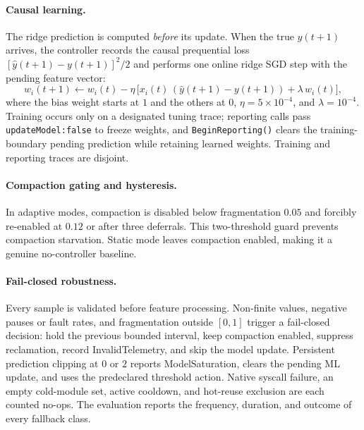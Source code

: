 \documentclass[acmsmall,screen]{acmart}
\begin{document}
\paragraph{Causal learning.}
The ridge prediction is computed \emph{before} its update. When the true
$y(t{+}1)$ arrives, the controller records the causal prequential loss
$[\hat{y}(t{+}1)-y(t{+}1)]^2/2$ and performs one online ridge SGD step with
the pending feature vector:
\begin{equation}
w_i(t{+}1) \leftarrow w_i(t) -
  \eta\,\bigl[x_i(t)\,(\hat{y}(t{+}1)-y(t{+}1)) + \lambda\, w_i(t)\bigr],
\end{equation}
where the bias weight starts at $1$ and the others at $0$,
$\eta = 5\times10^{-4}$, and $\lambda = 10^{-4}$. Training occurs only on a
designated tuning trace; reporting calls pass \texttt{updateModel:false} to
freeze weights, and \texttt{BeginReporting()} clears the training-boundary
pending prediction while retaining learned weights. Training and reporting
traces are disjoint.

\paragraph{Compaction gating and hysteresis.}
In adaptive modes, compaction is disabled below fragmentation $0.05$ and
forcibly re-enabled at $0.12$ or after three deferrals. This two-threshold
guard prevents compaction starvation. Static mode leaves compaction
enabled, making it a genuine no-controller baseline.

\paragraph{Fail-closed robustness.}
Every sample is validated before feature processing. Non-finite values,
negative pauses or fault rates, and fragmentation outside $[0,1]$ trigger a
fail-closed decision: hold the previous bounded interval, keep compaction
enabled, suppress reclamation, record \textsf{InvalidTelemetry}, and skip
the model update. Persistent prediction clipping at $0$ or $2$ reports
\textsf{ModelSaturation}, clears the pending ML update, and uses the
predeclared threshold action. Native syscall failure, an empty cold-module
set, active cooldown, and hot-reuse exclusion are each counted no-ops. The
evaluation reports the frequency, duration, and outcome of every fallback
class.
\end{document}
